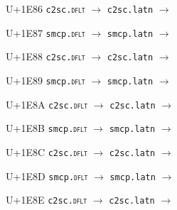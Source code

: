 \documentclass{article}
\begin{document}
\begin{substitutions}
\goodbreak

U+1E86  \linebreak
    \texttt{c2sc.\textsc{dflt}} $\to$  \linebreak
    \texttt{c2sc.latn} $\to$  

\goodbreak

U+1E87  \linebreak
    \texttt{smcp.\textsc{dflt}} $\to$  \linebreak
    \texttt{smcp.latn} $\to$  

\goodbreak

U+1E88  \linebreak
    \texttt{c2sc.\textsc{dflt}} $\to$  \linebreak
    \texttt{c2sc.latn} $\to$  

\goodbreak

U+1E89  \linebreak
    \texttt{smcp.\textsc{dflt}} $\to$  \linebreak
    \texttt{smcp.latn} $\to$  

\goodbreak

U+1E8A  \linebreak
    \texttt{c2sc.\textsc{dflt}} $\to$  \linebreak
    \texttt{c2sc.latn} $\to$  

\goodbreak

U+1E8B  \linebreak
    \texttt{smcp.\textsc{dflt}} $\to$  \linebreak
    \texttt{smcp.latn} $\to$  

\goodbreak

U+1E8C  \linebreak
    \texttt{c2sc.\textsc{dflt}} $\to$  \linebreak
    \texttt{c2sc.latn} $\to$  

\goodbreak

U+1E8D  \linebreak
    \texttt{smcp.\textsc{dflt}} $\to$  \linebreak
    \texttt{smcp.latn} $\to$  

\goodbreak

U+1E8E  \linebreak
    \texttt{c2sc.\textsc{dflt}} $\to$  \linebreak
    \texttt{c2sc.latn} $\to$  


\end{substitutions}
\end{document}
